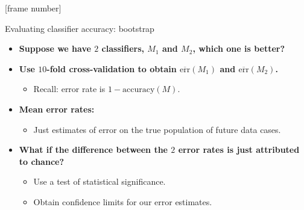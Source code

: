 \documentclass[aspectratio=169,t,table]{beamer}
\begin{document}
  {
    [frame number]
    \begin{frame}{Evaluating classifier accuracy: bootstrap}
      \begin{itemize}
        \item \textbf{Suppose we have $2$ classifiers, $M_1$ and $M_2$, which one is better?}
        \item \textbf{Use $10$-fold cross-validation to obtain $\overline{\text{err}}(M_1)$ and $\overline{\text{err}}(M_2)$.}
        \begin{itemize}
          \item Recall: error rate is $1-\text{accuracy}(M)$.
        \end{itemize}
        \item \textbf{Mean error rates:}
        \begin{itemize}
          \item Just estimates of error on the true population of future data cases.
        \end{itemize}
        \item \textbf{What if the difference between the $2$ error rates is just attributed to chance?}
        \begin{itemize}
          \item Use a test of statistical significance.
          \item Obtain confidence limits for our error estimates.
        \end{itemize}
      \end{itemize}
    \end{frame}
  }
\end{document}
